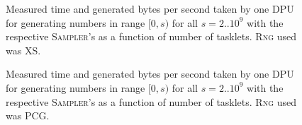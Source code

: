 \documentclass[a4paper]{scrartcl}
\begin{document}
\begin{figure}[!htb] \label{fig:3}
    \caption{
        Measured time and generated bytes per second taken by one DPU for generating numbers in range $[0,s)$ for all $s = 2..10^9$ with the respective \textsc{Sampler}'s as a function of number of tasklets. \textsc{Rng} used was XS.        
    }    
\end{figure}


\begin{figure}[!htb] \label{fig:4}
    \caption{
        Measured time and generated bytes per second taken by one DPU for generating numbers in range $[0,s)$ for all $s = 2..10^9$ with the respective \textsc{Sampler}'s as a function of number of tasklets. \textsc{Rng} used was PCG.      
    }
\end{figure}
\end{document}
